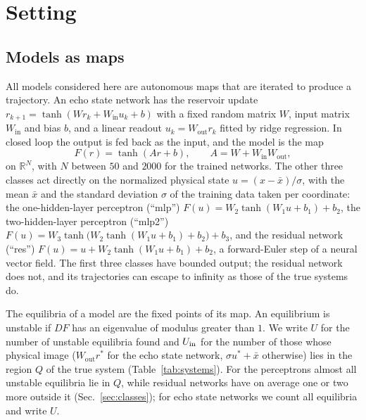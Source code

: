 \section{Setting}
\label{sec:setting}

\subsection{Models as maps}
\label{sec:models}

All models considered here are autonomous maps that are iterated to produce a trajectory. An echo state
network\cite{Jaeger2001EchoState,LukoseviciusJaeger2009Reservoir} has the reservoir update
$r_{k+1}=\tanh(Wr_k+W_{\mathrm{in}}u_k+b)$ with a fixed random matrix $W$, input matrix $W_{\mathrm{in}}$ and bias $b$, and
a linear readout $u_k=W_{\mathrm{out}}r_k$ fitted by ridge regression. In closed loop the output is fed back as the input,
and the model is the map
\begin{equation}
F(r)=\tanh(Ar+b),\qquad A=W+W_{\mathrm{in}}W_{\mathrm{out}},
\label{eq:esn}
\end{equation}
on $\mathbb{R}^N$, with $N$ between $50$ and $2000$ for the trained networks. The other three classes act directly on the
normalized physical state
$u=(x-\bar x)/\sigma$, with the mean $\bar x$ and the standard deviation $\sigma$ of the training data taken per
coordinate: the one-hidden-layer perceptron (``mlp'') $F(u)=W_2\tanh(W_1u+b_1)+b_2$, the two-hidden-layer
perceptron (``mlp2'') $F(u)=W_3\tanh\bigl(W_2\tanh(W_1u+b_1)+b_2\bigr)+b_3$, and the residual network (``res'')
$F(u)=u+W_2\tanh(W_1u+b_1)+b_2$, a forward-Euler step of a neural vector
field.\cite{He2016ResNet,E2017Proposal,HaberRuthotto2018Stable} The first three classes have bounded output; the residual
network does not, and its trajectories can escape to infinity as those of the true systems do.

The equilibria of a model are the fixed points of its map. An equilibrium is unstable if $DF$ has an eigenvalue of
modulus greater than $1$. We write $U$ for the number of unstable equilibria found and $U_{\mathrm{in}}$ for the number of those whose
physical image ($W_{\mathrm{out}}r^*$ for the echo state network, $\sigma u^*+\bar x$ otherwise) lies in the region $Q$ of the
true system (Table~\ref{tab:systems}). For the perceptrons almost all unstable equilibria lie in $Q$, while residual networks
have on average one or two more outside it (Sec.~\ref{sec:classes}); for echo state networks we count all equilibria and
write $U$.

